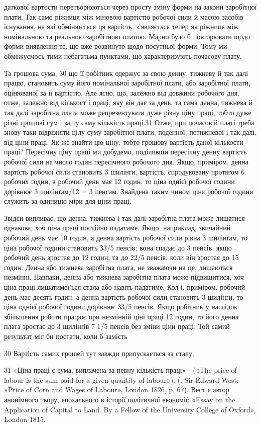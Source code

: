 даткової вартости перетворюються через просту зміну форми
на закони заробітної плати. Так само ріжниця між міновою вартістю
робочої сили й масою засобів існування, на які обмінюється
ця вартість, з’являється тепер як ріжниця між номінальною та
реальною заробітною платою. Марно було б повторювати щодо
форми виявлення те, що вже розвинуто щодо посутньої форми.
Тому ми обмежуємось тими небагатьма пунктами, що характеризують
почасову плату.

Та грошова сума, 30 що її робітник одержує за свою денну,
тижневу й так далі працю, становить суму його номінальної
заробітної плати, або заробітної плати, оцінюваної за її вартістю.
Але ясно, що, залежно від довжини робочого дня, отже,
залежно від кількост і праці, яку він дає за день, та сама денна,
тижнева й так далі заробітна плата може репрезентувати дуже
різну ціну праці, тобто дуже різні грошові сум і за ту саму кількість
праці.31 Отже, при почасовій платі треба знову таки відрізняти
цілу суму заробітної плати, поденної, потижневої і так
далі, від ціни праці. Як же знайти цю ціну, тобто грошову вартість
даної кількости праці? Пересічну ціну праці ми добудемо,
поділивши пересічну денну вартість робочої сили на число годин
пересічного робочого дня. Якщо, приміром, денна вартість
робочої сили становить 3 шилінґи, вартість, спродуковану протягом
6 робочих годин, а робочий день має 12 годин, то ціна однієї
робочої години дорівнює 3 шилінґам/12 = 3 пенсам. Знайдена
таким чином ціна робочої години служить за одиницю міри для
ціни праці.

Звідси випливає, що денна, тижнева і так далі заробітна плата
може лишатися однакова, хоч ціна праці постійно падатиме.
Якщо, наприклад, звичайний робочий день має 10 годин, а денна
вартість робочої сили рівна 3 шилінґам, то ціна робочої години
становить З3/5 пенсів; вона спадає до 3 пенсів, якщо робочий день
зростає до 12 годин, та до 22/5 пенсів, коли він зростає до 15 годин.
Денна або тижнева заробітна плата, не зважаючи на це,
лишаються незмінні. Навпаки, денна або тижнева заробітна
плата може підвищитися, хоч ціна праці лишатимеї'ься стала або
навіть падатиме. Кол і, приміром, робочий день має десять годин,
а денна вартість робочої сили становить 3 шилінґи, то ціна однієї
робочої години дорівнює 33/5 пенсів. Якщо робітник у наслідок
збільшення роботи працює при незмінній ціні праці 12 годин,
то його денна плата зростає до 3 шилінґів 7 1/5 пенсів без зміни
ціни праці. Той самий результат міг би постати, коли б замість

30 Вартість самих грошей тут завжди припускається за сталу.

31 «Ціна праці є сума, виплачена за певну кількість праці» - («The
price of labour is the sum paid for a given quantity of labour»). (. Sir Edward
West: «Price of Corn and Wages of Labour», London 1826, p. 67).
Вест є автор анонімного твору, епохального в історії політичної економії:
«Essay on the Application of Capital to Land. By a Fellow of the
University College of Oxford», London 1815.
